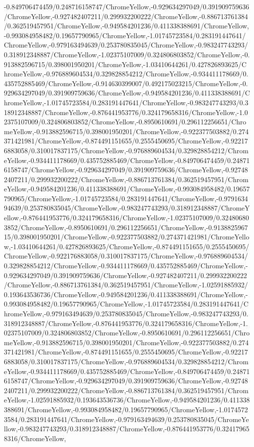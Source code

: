 {\begin{tikzternal}
{-0.849706474459/0.248716158747/ChromeYellow,-0.929634297049/0.391909759636/ChromeYellow,-0.927482407211/0.299932200222/ChromeYellow,-0.886713761384/0.362519457951/ChromeYellow,-0.949584201236/0.411338388691/ChromeYellow,-0.993084958482/0.19657790965/ChromeYellow,-1.01745723584/0.283191447641/ChromeYellow,-0.979163494639/0.253780835045/ChromeYellow,-0.983247743293/0.318912348887/ChromeYellow,-1.02375107009/0.324806803852/ChromeYellow,-0.913882596715/0.398001950201/ChromeYellow,-1.03410644261/0.427826893625/ChromeYellow,-0.976889604534/0.329828854212/ChromeYellow,-0.934411178669/0.435752885469/ChromeYellow,-0.914630399007/0.492175023215/ChromeYellow,-0.929634297049/0.391909759636/ChromeYellow,-0.949584201236/0.411338388691/ChromeYellow,-1.01745723584/0.283191447641/ChromeYellow,-0.983247743293/0.318912348887/ChromeYellow,-0.876441953776/0.324179658316/ChromeYellow,-1.02375107009/0.324806803852/ChromeYellow,-0.8950610691/0.296112256651/ChromeYellow,-0.913882596715/0.398001950201/ChromeYellow,-0.922377503882/0.274371421981/ChromeYellow,-0.874491151655/0.2555450695/ChromeYellow,-0.922176883058/0.310017837175/ChromeYellow,-0.976889604534/0.329828854212/ChromeYellow,-0.934411178669/0.435752885469/ChromeYellow,-0.849706474459/0.248716158747/ChromeYellow,-0.929634297049/0.391909759636/ChromeYellow,-0.927482407211/0.299932200222/ChromeYellow,-0.886713761384/0.362519457951/ChromeYellow,-0.949584201236/0.411338388691/ChromeYellow,-0.993084958482/0.19657790965/ChromeYellow,-1.01745723584/0.283191447641/ChromeYellow,-0.979163494639/0.253780835045/ChromeYellow,-0.983247743293/0.318912348887/ChromeYellow,-0.876441953776/0.324179658316/ChromeYellow,-1.02375107009/0.324806803852/ChromeYellow,-0.8950610691/0.296112256651/ChromeYellow,-0.913882596715/0.398001950201/ChromeYellow,-0.922377503882/0.274371421981/ChromeYellow,-1.03410644261/0.427826893625/ChromeYellow,-0.874491151655/0.2555450695/ChromeYellow,-0.922176883058/0.310017837175/ChromeYellow,-0.976889604534/0.329828854212/ChromeYellow,-0.934411178669/0.435752885469/ChromeYellow,-0.929634297049/0.391909759636/ChromeYellow,-0.927482407211/0.299932200222/ChromeYellow,-0.886713761384/0.362519457951/ChromeYellow,-1.02591885932/0.193643536736/ChromeYellow,-0.949584201236/0.411338388691/ChromeYellow,-0.993084958482/0.19657790965/ChromeYellow,-1.01745723584/0.283191447641/ChromeYellow,-0.979163494639/0.253780835045/ChromeYellow,-0.983247743293/0.318912348887/ChromeYellow,-0.876441953776/0.324179658316/ChromeYellow,-1.02375107009/0.324806803852/ChromeYellow,-0.8950610691/0.296112256651/ChromeYellow,-0.913882596715/0.398001950201/ChromeYellow,-0.922377503882/0.274371421981/ChromeYellow,-0.874491151655/0.2555450695/ChromeYellow,-0.922176883058/0.310017837175/ChromeYellow,-0.976889604534/0.329828854212/ChromeYellow,-0.934411178669/0.435752885469/ChromeYellow,-0.849706474459/0.248716158747/ChromeYellow,-0.929634297049/0.391909759636/ChromeYellow,-0.927482407211/0.299932200222/ChromeYellow,-0.886713761384/0.362519457951/ChromeYellow,-1.02591885932/0.193643536736/ChromeYellow,-0.949584201236/0.411338388691/ChromeYellow,-0.993084958482/0.19657790965/ChromeYellow,-1.01745723584/0.283191447641/ChromeYellow,-0.979163494639/0.253780835045/ChromeYellow,-0.983247743293/0.318912348887/ChromeYellow,-0.876441953776/0.324179658316/ChromeYellow,}
\end{tikzternal}}
